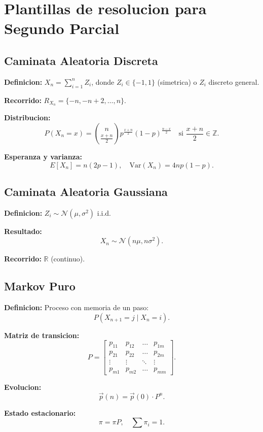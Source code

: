 \documentclass{article}
\begin{document}
\section{Plantillas de resolucion para Segundo Parcial}

\subsection{Caminata Aleatoria Discreta}

\textbf{Definicion:} $X_n = \sum_{i=1}^n Z_i$, donde $Z_i \in \{-1, 1\}$ (simetrica) o $Z_i$ discreto general.

\textbf{Recorrido:} $R_{X_n} = \{-n, -n+2, \dots, n\}$.

\textbf{Distribucion:}
\[
P(X_n = x) = \binom{n}{\frac{x+n}{2}} p^{\frac{x+n}{2}} (1-p)^{\frac{n-x}{2}} \quad \text{si } \frac{x+n}{2} \in \mathbb{Z}.
\]

\textbf{Esperanza y varianza:}
\[
E[X_n] = n (2p - 1), \quad \text{Var}(X_n) = 4n p(1-p).
\]

\subsection{Caminata Aleatoria Gaussiana}

\textbf{Definicion:} $Z_i \sim \mathcal{N}(\mu, \sigma^2)$ i.i.d.

\textbf{Resultado:}
\[
X_n \sim \mathcal{N}(n\mu, n\sigma^2).
\]

\textbf{Recorrido:} $\mathbb{R}$ (continuo).

\subsection{Markov Puro}

\textbf{Definicion:} Proceso con memoria de un paso:
\[
P(X_{n+1} = j \mid X_n = i).
\]

\textbf{Matriz de transicion:}
\[
P = \begin{bmatrix}
  p_{11} & p_{12} & \dots & p_{1m} \\
  p_{21} & p_{22} & \dots & p_{2m} \\
  \vdots & \vdots & \ddots & \vdots \\
  p_{m1} & p_{m2} & \dots & p_{mm}
\end{bmatrix}.
\]

\textbf{Evolucion:}
\[
\vec{p}(n) = \vec{p}(0) \cdot P^n.
\]

\textbf{Estado estacionario:}
\[
\pi = \pi P, \quad \sum \pi_i = 1.
\]
\end{document}
